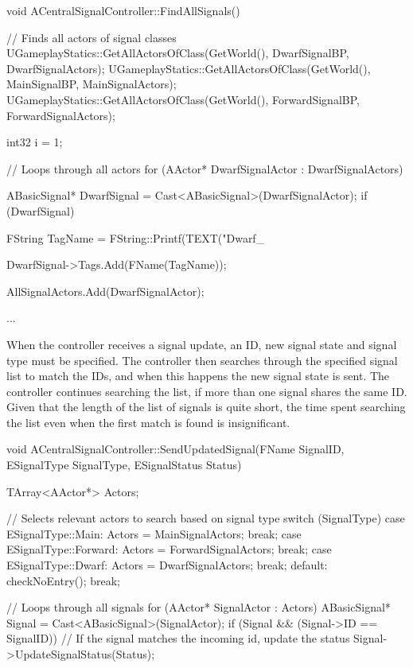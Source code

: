 \begin{code} 
void ACentralSignalController::FindAllSignals()
{
	// Finds all actors of signal classes
	UGameplayStatics::GetAllActorsOfClass(GetWorld(), DwarfSignalBP, DwarfSignalActors);
	UGameplayStatics::GetAllActorsOfClass(GetWorld(), MainSignalBP, MainSignalActors);
	UGameplayStatics::GetAllActorsOfClass(GetWorld(), ForwardSignalBP, ForwardSignalActors);

	int32 i = 1;

	// Loops through all actors
	for (AActor* DwarfSignalActor : DwarfSignalActors)
	{
		ABasicSignal* DwarfSignal = Cast<ABasicSignal>(DwarfSignalActor);
		if (DwarfSignal)
		{
			FString TagName = FString::Printf(TEXT("Dwarf_%
			
			DwarfSignal->Tags.Add(FName(TagName));

			AllSignalActors.Add(DwarfSignalActor);
		}
	}
	...
}
\end{code}

When the controller receives a signal update, an ID, new signal state and signal type must be specified. The controller then searches through the specified signal list to match the IDs, and when this happens the new signal state is sent. The controller continues searching the list, if more than one signal shares the same ID. Given that the length of the list of signals is quite short, the time spent searching the list even when the first match is found is insignificant. %

\begin{code}
void ACentralSignalController::SendUpdatedSignal(FName SignalID, ESignalType SignalType, ESignalStatus Status)
{
	TArray<AActor*> Actors;

	// Selects relevant actors to search based on signal type
	switch (SignalType)
	{
	case ESignalType::Main:
		Actors = MainSignalActors;
		break;
	case ESignalType::Forward:
		Actors = ForwardSignalActors;
		break;
	case ESignalType::Dwarf:
		Actors = DwarfSignalActors;
		break;
	default:
		checkNoEntry();
		break;
	}

	// Loops through all signals
	for (AActor* SignalActor : Actors)
	{
		ABasicSignal* Signal = Cast<ABasicSignal>(SignalActor);
		if (Signal && (Signal->ID == SignalID))
		{
			// If the signal matches the incoming id, update the status
			Signal->UpdateSignalStatus(Status);
		}
	}
}
\end{code}

